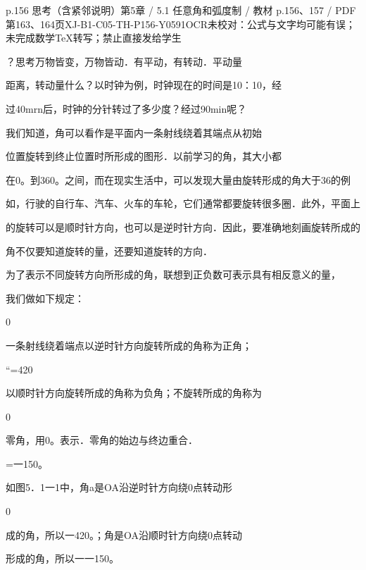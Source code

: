 \begin{bankitem}{p.156 思考（含紧邻说明）}{第5章 / 5.1 任意角和弧度制 / 教材 p.156、157 / PDF 第163、164页}{XJ-B1-C05-TH-P156-Y0591}{OCR未校对：公式与文字均可能有误；未完成数学TeX转写；禁止直接发给学生}
\begin{ocrdraft}
\par
？思考万物皆变，万物皆动．有平动，有转动．平动量
\par
距离，转动量什么？以时钟为例，时钟现在的时间是10：10，经
\par
过40mrn后，时钟的分针转过了多少度？经过90min呢？
\par
我们知道，角可以看作是平面内一条射线绕着其端点从初始
\par
位置旋转到终止位置时所形成的图形．以前学习的角，其大小都
\par
在0。到360。之间，而在现实生活中，可以发现大量由旋转形成的角大于36的例
\par
如，行驶的自行车、汽车、火车的车轮，它们通常都要旋转很多圈．此外，平面上
\par
的旋转可以是顺时针方向，也可以是逆时针方向．因此，要准确地刻画旋转所成的
\par
角不仅要知道旋转的量，还要知道旋转的方向．
\par
为了表示不同旋转方向所形成的角，联想到正负数可表示具有相反意义的量，
\par
我们做如下规定：
\par
0
\par
一条射线绕着端点以逆时针方向旋转所成的角称为正角；
\par
“=420
\par
以顺时针方向旋转所成的角称为负角；不旋转所成的角称为
\par
0
\par
零角，用0。表示．零角的始边与终边重合．
\par
=一150。
\par
如图5．1一1中，角a是OA沿逆时针方向绕0点转动形
\par
0
\par
成的角，所以一420。；角是OA沿顺时针方向绕0点转动
\par
形成的角，所以一一150。

\end{ocrdraft}
\end{bankitem}
